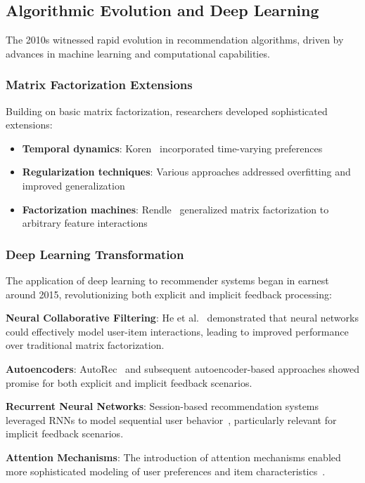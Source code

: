 \subsection{Algorithmic Evolution and Deep Learning}

The 2010s witnessed rapid evolution in recommendation algorithms, driven by advances in machine learning and computational capabilities.

\subsubsection{Matrix Factorization Extensions}
Building on basic matrix factorization, researchers developed sophisticated extensions:
\begin{itemize}
    \item \textbf{Temporal dynamics}: Koren~\cite{koren2009collaborative} incorporated time-varying preferences
    \item \textbf{Regularization techniques}: Various approaches addressed overfitting and improved generalization
    \item \textbf{Factorization machines}: Rendle~\cite{rendle2012factorization} generalized matrix factorization to arbitrary feature interactions
\end{itemize}

\subsubsection{Deep Learning Transformation}
The application of deep learning to recommender systems began in earnest around 2015, revolutionizing both explicit and implicit feedback processing:

\textbf{Neural Collaborative Filtering}: He et al.~\cite{he2017neural} demonstrated that neural networks could effectively model user-item interactions, leading to improved performance over traditional matrix factorization.

\textbf{Autoencoders}: AutoRec~\cite{sedhain2015autorec} and subsequent autoencoder-based approaches showed promise for both explicit and implicit feedback scenarios.

\textbf{Recurrent Neural Networks}: Session-based recommendation systems leveraged RNNs to model sequential user behavior~\cite{hidasi2015session}, particularly relevant for implicit feedback scenarios.

\textbf{Attention Mechanisms}: The introduction of attention mechanisms enabled more sophisticated modeling of user preferences and item characteristics~\cite{chen2017attentive}.

